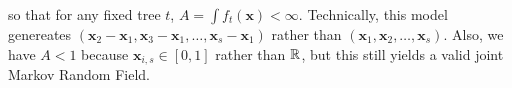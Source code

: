 \documentclass {article}
\newcommand\data{\pmb{x}}
\begin{document}
so that for any fixed tree $t$, $A = \int f_t(\data) < \infty$.  Technically, this model genereates $(\data_2 - \data_1, \data_3 - \data_1, \dots, \data_s - \data_1)$ rather than $(\data_1, \data_2, \dots, \data_s)$.  Also, we have $A < 1$ because $\data_{i,s}\in [0,1]$ rather than ${\mathbb R}$, but this still yields a valid joint Markov Random Field.

% 
% 
% 
% 
% 
% 
% 
\end{document}
